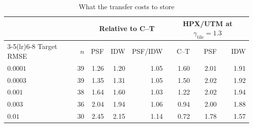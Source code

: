 \begin{table}[t]
\centering
\caption{What the transfer costs to store}
\label{tab:transfer_cost}
\footnotesize
\begin{tabular}{@{}lrrrrrrr@{}}
\toprule
 & & \multicolumn{3}{c}{Relative to C--T} & \multicolumn{3}{c}{HPX/UTM at $\gamma_{\mathrm{tile}}{=}1.3$} \\
\cmidrule(lr){3-5}\cmidrule(lr){6-8}
Target RMSE & $n$ & PSF & IDW & PSF/IDW & C--T & PSF & IDW \\
\midrule
$0.0001$ & 39 & 1.26 & 1.20 & 1.05 & 1.60 & 2.01 & 1.91 \\
$0.0003$ & 39 & 1.35 & 1.31 & 1.05 & 1.50 & 2.02 & 1.92 \\
$0.001$ & 38 & 1.64 & 1.60 & 1.03 & 1.22 & 2.02 & 1.94 \\
$0.003$ & 36 & 2.04 & 1.94 & 1.06 & 0.94 & 2.00 & 1.88 \\
$0.01$ & 30 & 2.45 & 2.15 & 1.14 & 0.72 & 1.78 & 1.57 \\
\bottomrule
\end{tabular}

\end{table}
